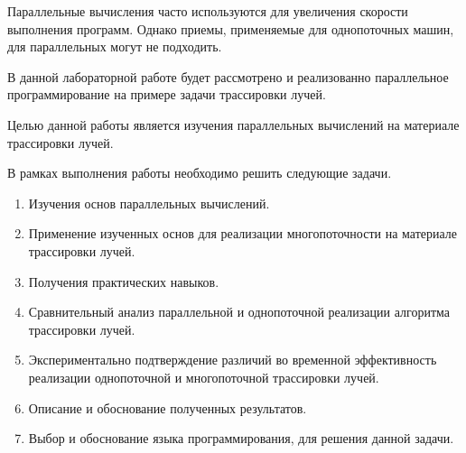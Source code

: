 \Introduction
Параллельные вычисления часто используются для увеличения скорости выполнения
программ. Однако приемы, применяемые для однопоточных машин, для
параллельных могут не подходить.

В данной лабораторной работе будет рассмотрено и реализованно параллельное
программирование на примере задачи трассировки лучей.

Целью данной работы является изучения параллельных вычислений на материале
трассировки лучей.

В рамках выполнения работы необходимо решить следующие задачи.

\begin{enumerate}
	\item Изучения основ параллельных вычислений.
	\item Применение изученных основ для реализации многопоточности на материале трассировки лучей.
	\item Получения практических навыков.
	\item Сравнительный анализ параллельной и однопоточной реализации алгоритма трассировки лучей.
	\item Экспериментально подтверждение различий во временной эффективность реализации однопоточной и многопоточной трассировки лучей.
	\item Описание и обоснование полученных результатов.
	\item Выбор и обоснование языка программирования, для решения данной задачи.
\end{enumerate}